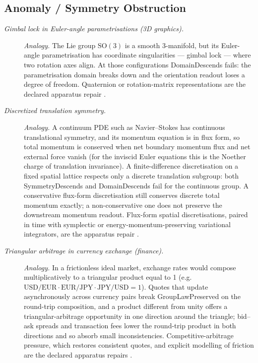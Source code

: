 \subsection*{ Anomaly / Symmetry Obstruction}
\begingroup\small
\begin{description}
\item[\emph{Gimbal lock in Euler-angle parametrisations
(3D graphics).}] \textit{Analogy.}
The Lie group \(\mathrm{SO}(3)\) is a smooth 3-manifold, but its
Euler-angle parametrisation has coordinate singularities --- gimbal
lock --- where two rotation axes align.  At those configurations
DomainDescends fails: the parametrisation domain breaks down and
the orientation readout loses a degree of freedom.  Quaternion or
rotation-matrix representations are the declared apparatus repair
\citep{Kuipers1999QuaternionsRotationSequences}.

\item[\emph{Discretized translation symmetry.}] \textit{Analogy.}
A continuum PDE such as Navier--Stokes has continuous translational
symmetry, and its momentum equation is in flux form, so total momentum is conserved when net boundary momentum flux and net external force vanish (for the inviscid Euler equations this is the Noether charge of translation invariance).  A finite-difference discretisation on a fixed spatial
lattice respects only a discrete translation subgroup: both
SymmetryDescends and DomainDescends fail for the continuous group.  A
conservative flux-form discretisation still conserves discrete total
momentum exactly; a non-conservative one does not preserve the
downstream momentum readout.  Flux-form spatial discretisations,
paired in time with symplectic or energy-momentum-preserving
variational integrators, are the apparatus repair
\citep{HairerLubichWanner2006GeometricNumerical}.

\item[\emph{Triangular arbitrage in currency exchange (finance).}] \textit{Analogy.}
In a frictionless ideal market, exchange rates would compose
multiplicatively to a triangular product equal to 1
(e.g.\ \(\mathrm{USD/EUR}\cdot\mathrm{EUR/JPY}\cdot
\mathrm{JPY/USD}=1\)).  Quotes that update asynchronously across currency pairs break
GroupLawPreserved on the round-trip composition, and a product
different from unity offers a triangular-arbitrage opportunity in one
direction around the triangle; bid--ask spreads and transaction fees
lower the round-trip product in both directions and so absorb small
inconsistencies.  Competitive-arbitrage pressure, which restores
consistent quotes, and explicit modelling of friction are the
declared apparatus repairs
\citep{Aliber1973InterestRateParity}.


\end{description}
